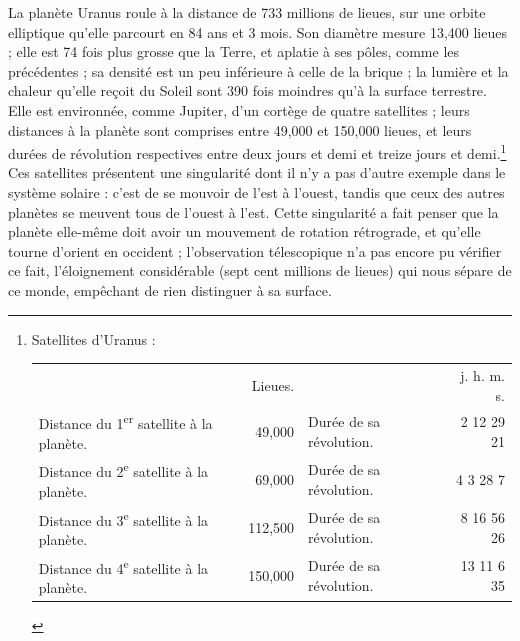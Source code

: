 \documentclass[a4paper, 11pt, oneside, landscape]{article}
\begin{document}
La planète Uranus roule à la distance de 733 millions de lieues, sur une orbite elliptique qu'elle parcourt en 84 ans et 3 mois. Son diamètre mesure 13,400 lieues ; elle est 74 fois plus grosse que la Terre, et aplatie à ses pôles, comme les précédentes ; sa densité est un peu inférieure à celle de la brique ; la lumière et la chaleur qu'elle reçoit du Soleil sont 390 fois moindres qu'à la surface terrestre. Elle est environnée, comme Jupiter, d'un cortège de quatre satellites ; leurs distances à la planète sont comprises entre 49,000 et 150,000 lieues, et leurs durées de révolution respectives entre deux jours et demi et treize jours et demi.\footnote{Satellites d'Uranus :\\
\begin{table}[H]
    \centering\color{BrickRed}
    \bfseries
    \footnotesize
    \begin{tabular}{l r l r}
        ~ & Lieues. & ~ & j. h. m. s.   \\
        Distance du 1\textsuperscript{er} satellite à la planète. & 49,000 & Durée de sa révolution. & 2 12 29 21   \\
        Distance du 2\textsuperscript{e} satellite à la planète. & 69,000 & Durée de sa révolution. & 4 3 28 7   \\
        Distance du 3\textsuperscript{e} satellite à la planète. & 112,500 & Durée de sa révolution. & 8 16 56 26   \\
        Distance du 4\textsuperscript{e} satellite à la planète. & 150,000 & Durée de sa révolution. & 13 11 6 35 \\
    \end{tabular}
\end{table}} Ces satellites présentent une singularité dont il n'y a pas d'autre exemple dans le système solaire : c'est de se mouvoir de l'est à l'ouest, tandis que ceux des autres planètes se meuvent tous de l'ouest à l'est. Cette singularité a fait penser que la planète elle-même doit avoir un mouvement de rotation rétrograde, et qu'elle tourne d'orient en occident ; l'observation télescopique n'a pas encore pu vérifier ce fait, l'éloignement considérable (sept cent millions de lieues) qui nous sépare de ce monde, empêchant de rien distinguer à sa surface.
\end{document}
